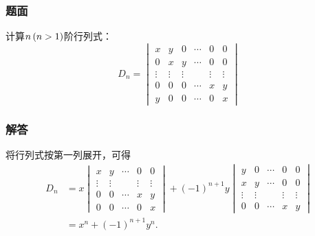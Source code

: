 \documentclass[9pt,xcolor=svgnames]{beamer} %
\begin{document}
\begin{frame}
    \frametitle{题面}
    计算\(n\left( n>1 \right)\)阶行列式：
    \begin{equation*}
        D_n=
        \begin{vmatrix}
            x      & y      & 0      & \cdots & 0      & 0      \\
            0      & x      & y      & \cdots & 0      & 0      \\
            \vdots & \vdots & \vdots &        & \vdots & \vdots \\
            0      & 0      & 0      & \cdots & x      & y      \\
            y      & 0      & 0      & \cdots & 0      & x
        \end{vmatrix}
    \end{equation*}
\end{frame}
\begin{frame}
    \frametitle{解答}
    将行列式按第一列展开，可得
    \begin{align*}
        D_n & =x
        \begin{vmatrix}
            x      & y      & \cdots & 0      & 0      \\
            \vdots & \vdots &        & \vdots & \vdots \\
            0      & 0      & \cdots & x      & y      \\
            0      & 0      & \cdots & 0      & x
        \end{vmatrix}+(-1)^{n+1}y
        \begin{vmatrix}
            y      & 0      & \cdots & 0      & 0      \\
            x      & y      & \cdots & 0      & 0      \\
            \vdots & \vdots &        & \vdots & \vdots \\
            0      & 0      & \cdots & x      & y
        \end{vmatrix} \\
            & =x^n+(-1)^{n+1}y^n.
    \end{align*}
\end{frame}
\end{document}
